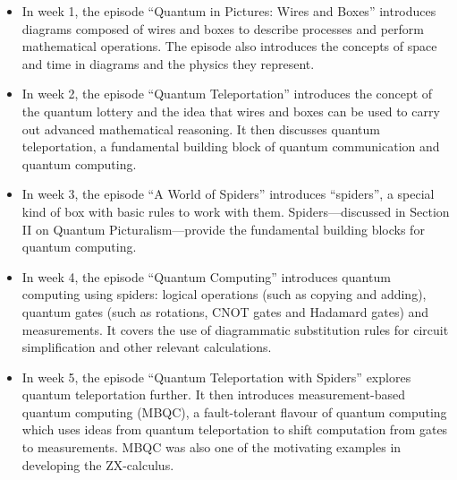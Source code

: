 \begin{itemize}
\item In week 1, the episode ``Quantum in Pictures: Wires and Boxes'' introduces diagrams composed of wires and boxes to describe processes and perform mathematical operations. The episode also introduces the concepts of space and time in diagrams and the physics they represent.
\item In week 2, the episode ``Quantum Teleportation'' introduces the concept of the quantum lottery and the idea that wires and boxes can be used to carry out advanced mathematical reasoning. It then discusses quantum teleportation, a fundamental building block of quantum communication and quantum computing.
\item In week 3, the episode ``A World of Spiders'' introduces ``spiders'', a special kind of box with basic rules to work with them. Spiders---discussed in Section II on Quantum Picturalism---provide the fundamental building blocks for quantum computing.
\item In week 4, the episode ``Quantum Computing'' introduces quantum computing using spiders: logical operations (such as copying and adding), quantum gates (such as rotations, CNOT gates and Hadamard gates) and measurements.
It covers the use of diagrammatic substitution rules for circuit simplification and other relevant calculations.
\item In week 5, the episode ``Quantum Teleportation with Spiders'' explores quantum teleportation further. It then introduces measurement-based quantum computing (MBQC), a fault-tolerant flavour of quantum computing which uses ideas from quantum teleportation to shift computation from gates to measurements. MBQC was also one of the motivating examples in developing the ZX-calculus.

\end{itemize}
